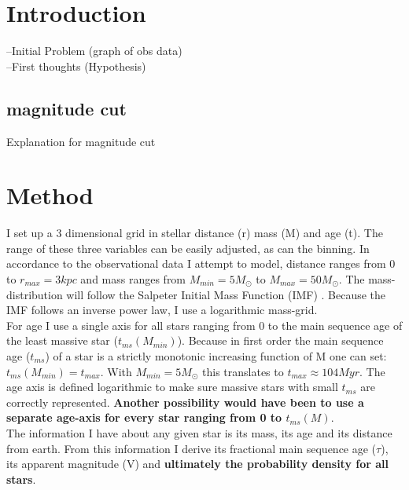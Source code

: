 \documentclass[a4paper,10pt]{article}
\date{03/15/15}
\begin{document}
 \section{Introduction}
 --Initial Problem (graph of obs data)\\
 --First thoughts (Hypothesis)\\
 \subsection{magnitude cut}
 Explanation for magnitude cut \label{magnitudecut}
 \section{Method}
 
 I set up a 3 dimensional grid in stellar distance (r) mass (M) and age (t). The range 
 of these three variables can be easily adjusted, as can the binning. In accordance to the observational data I attempt to model, 
 distance ranges from 0 to $r_{max}=3kpc$ and mass ranges
 from $M_{min}=5M_\odot$ to $M_{max}=50M_\odot$. The mass-distribution will follow the Salpeter Initial Mass Function (IMF)
 \citep[see][]{1955ApJ...121..161S}. Because the IMF follows an inverse power law, I use a logarithmic mass-grid.\\ 
 
 For age I use a single axis for all stars ranging from 0 to the main sequence age of the least massive star ($t_{ms}(M_{min})$). 
 Because in first order the main sequence age ($t_{ms}$) of 
 a star is a strictly monotonic increasing function of M one can set: $t_{ms}(M_{min})=t_{max}$. With $M_{min}=5M_\odot$ this 
 translates to $t_{max}\approx 104Myr$. The age axis is defined logarithmic to make sure massive stars with small $t_{ms}$ are correctly
 represented. \textbf{Another possibility would have been to use a separate age-axis for every star ranging from 0 to $t_{ms}(M)$}. \\ 
  
 The information I have about any given star is its mass, its age and its distance from earth. From this information
 I derive its fractional main sequence age ($\tau$), its apparent magnitude (V) and \textbf{ultimately the probability density for all stars}.\\  
 
\end{document}
